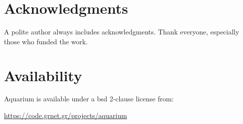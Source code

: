 \documentclass[letterpaper,twocolumn,10pt]{article}
\begin{document}
\section{Acknowledgments}

A polite author always includes acknowledgments.  Thank everyone,
especially those who funded the work. 

\section{Availability}

Aquarium is available under a {\sc bsd} 2-clause license from:
\begin{center}
\url{https://code.grnet.gr/projects/aquarium}
\end{center}

{\footnotesize 
}

\theendnotes
\end{document}
